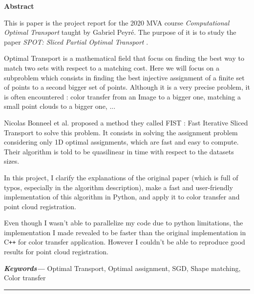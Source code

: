 \documentclass[a4paper,12pt]{article}
\providecommand{\keywords}[1]
{
  \textbf{\textit{Keywords---}} #1
}
\begin{document}

\tableofcontents
\thispagestyle{empty}
\setcounter{page}{0}

\newpage


\begin{center}
\textbf{Abstract}
\end{center}

This is paper is the project report for the 2020 MVA course \textit{Computational Optimal Transport} taught by Gabriel Peyré. The purpose of it is to study the paper \textit{SPOT: Sliced Partial Optimal Transport} \cite{BC19}.

Optimal Transport is a mathematical field that focus on finding the best way to match two sets with respect to a matching cost. Here we will focus on a subproblem which consists in finding the best injective assignment of a finite set of points to a second bigger set of points. Although it is a very precise problem, it is often encountered : color transfer from an Image to a bigger one, matching a small point clouds to a bigger one, ...

Nicolas Bonneel et al. proposed a method they called FIST : Fast Iterative Sliced Transport to solve this problem. It consists in solving the assignment problem considering only 1D optimal assignments, which are fast and easy to compute. Their algorithm is told to be quasilinear in time with respect to the datasets sizes.

In this project, I clarify the explanations of the original paper (which is full of typos, especially in the algorithm description), make a fast and user-friendly implementation of this algorithm in Python, and apply it to color transfer and point cloud registration.

Even though I wasn't able to parallelize my code due to python limitations, the implementation I made revealed to be faster than the original implementation in C\texttt{++} for color transfer application. However I couldn't be able to reproduce good results for point cloud registration.

\bigskip


\keywords{Optimal Transport, Optimal assignment, SGD, Shape matching, Color transfer}

\begin{center}
    \rule{4cm}{0.4pt}
\end{center}
\end{document}
